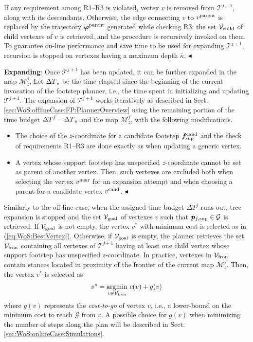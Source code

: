If any requirement among R1--R3 is violated, vertex $v$ is removed from $\mathcal{T}^{j+1}$, along with its descendants.
Otherwise, the edge connecting $v$ to $v^{\rm parent}$ is replaced by the trajectory ${\bm{\varphi}}^{\rm parent}$ generated while checking R3; the set ${\cal V}_{\rm child}$ of child vertexes of $v$ is retrieved, and the procedure is recursively invoked on them. 
To guarantee on-line performance and save time to be used for expanding $\mathcal{T}^{j+1}$, recursion is stopped on vertexes having a maximum depth $\bar{\kappa}$. \hfill $\blacktriangleleft$

{\bf Expanding}: Once $\mathcal{T}^{j+1}$ has been updated, it can be further expanded in the map $\mathcal{M}_z^j$.
Let ${\Delta T}_{\rm e}$ be the time elapsed since the beginning of the current invocation of the footstep planner, i.e., the time spent in initializing and updating $\mathcal{T}^{j+1}$.
The expansion of $\mathcal{T}^{j+1}$ works iteratively as described in Sect. \ref{sec:WoS:offlineCase:FP:PlannerOverview} using the remaining portion of the time budget ${\Delta T}^j - {\Delta T}_{\rm e}$ and the map $\mathcal{M}_z^j$, with the following modifications.
\begin{itemize}
    \item The choice of the $z$-coordinate for a candidate footstep ${\bm{f}}_{\rm sup}^{\rm cand}$ and the check of requirements R1--R3 are done exactly as when updating a generic vertex. 
    \item A vertex whose support footstep has unspecified $z$-coordinate cannot be set as parent of another vertex.
    Then, such vertexes are excluded both when selecting the vertex $v^{\rm near}$ for an expansion attempt and when choosing a parent for a candidate vertex $v^{\rm cand}$. \hfill $\blacktriangleleft$
\end{itemize} 

Similarly to the off-line case, when the assigned time budget ${\Delta T}^j$ runs out, tree expansion is stopped and the set ${\cal V}_{\rm goal}$ of vertexes $v$ such that ${\bm{p}}_{f,{\rm sup}} \in {\cal G}$ is retrieved.
%
If ${\cal V}_{\rm goal}$ is not empty, the vertex $v^*$ with minimum cost is selected as in (\ref{eq:WoS:BestVertex}).
%
Otherwise, if ${\cal V}_{\rm goal}$ is empty, the planner retrieves the set ${\cal V}_{\rm fron}$ containing all vertexes of $\mathcal{T}^{j+1}$ having at least one child vertex whose support footstep has unspecified $z$-coordinate.
In practice, vertexes in ${\cal V}_{\rm fron}$ contain stances located in proximity of the frontier of the current map $\mathcal{M}_z^j$.
Then, the vertex $v^*$ is selected as
\begin{equation}
    \label{eq:WoS:BestVertexSubgoal}
    v^* = \underset{v \in {\cal V}_{\rm fron}}{\arg\!\min} \ c(v)+g(v)
\end{equation}
where $g(v)$ represents the \textit{cost-to-go} of vertex $v$, i.e., a lower-bound on the minimum cost to reach $\mathcal{G}$ from $v$.
A possible choice for $g(v)$ when minimizing the number of steps along the plan will be described in Sect. \ref{sec:WoS:onlineCase:Simulations}.

